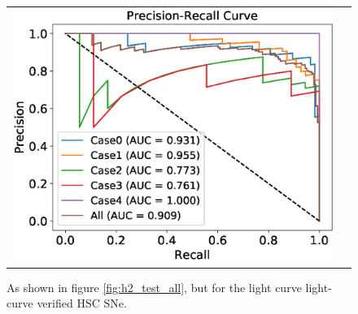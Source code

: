 \documentclass[proof]{pasj01}
\providecommand{\DIFadd}[1]{{\protect\color{blue} \sf #1}} %
\providecommand{\DIFdel}[1]{{\protect\color{red} \scriptsize #1}} %
\providecommand{\DIFaddFL}[1]{\DIFadd{#1}} %
\providecommand{\DIFdelFL}[1]{\DIFdel{#1}} %
\providecommand{\DIFaddbeginFL}{} %
\providecommand{\DIFaddendFL}{} %
\providecommand{\DIFdelbeginFL}{} %
\providecommand{\DIFdelendFL}{} %
\newcommand{\DIFscaledelfig}{0.5}
\newlength{\DIFdelgraphicswidth} %
\newlength{\DIFdelgraphicsheight} %
\newcommand{\DIFaddincludegraphics}[2][]{{\color{blue}\fbox{\DIFOincludegraphics[#1]{#2}}}} %
\newcommand{\DIFdelincludegraphics}[2][]{%
\sbox{\DIFdelgraphicsbox}{\DIFOincludegraphics[#1]{#2}}%
\settoboxwidth{\DIFdelgraphicswidth}{\DIFdelgraphicsbox} %
\settoboxtotalheight{\DIFdelgraphicsheight}{\DIFdelgraphicsbox} %
\scalebox{\DIFscaledelfig}{%
\parbox[b]{\DIFdelgraphicswidth}{\usebox{\DIFdelgraphicsbox}\\[-\baselineskip] \rule{\DIFdelgraphicswidth}{0em}}\llap{\resizebox{\DIFdelgraphicswidth}{\DIFdelgraphicsheight}{%
\setlength{\unitlength}{\DIFdelgraphicswidth}%
\begin{picture}(1,1)%
\thicklines\linethickness{2pt} %
{\color[rgb]{1,0,0}\put(0,0){\framebox(1,1){}}}%
{\color[rgb]{1,0,0}\put(0,0){\line( 1,1){1}}}%
{\color[rgb]{1,0,0}\put(0,1){\line(1,-1){1}}}%
\end{picture}%
}\hspace*{3pt}}} %
} %
\DeclareRobustCommand{\DIFaddbeginFL}{\DIFOaddbeginFL \let\includegraphics\DIFaddincludegraphics} %
\DeclareRobustCommand{\DIFaddendFL}{\DIFOaddendFL \let\includegraphics\DIFOincludegraphics} %
\DeclareRobustCommand{\DIFdelbeginFL}{\DIFOdelbeginFL \let\includegraphics\DIFdelincludegraphics} %
\DeclareRobustCommand{\DIFdelendFL}{\DIFOaddendFL \let\includegraphics\DIFOincludegraphics} %
\begin{document}
\begin{figure}[htbp]
\begin{tabular}{cc}
\begin{minipage}{0.5\hsize}
\begin{center}
                \includegraphics[width=\columnwidth]{figures/10_absolute-magnitude-scaled-flux-remove-y_SNdata_test_190522_PreRec_noedge_spec.eps}
            \end{center}
        \end{minipage}
    \end{tabular}
    \vspace{2mm}
    \caption{%
  As shown in figure \ref{fig:h2_test_all}, but for the \DIFdelbeginFL \DIFdelFL{light curve }\DIFdelendFL \DIFaddbeginFL \DIFaddFL{light-curve }\DIFaddendFL verified HSC SNe. 
}%
    \label{fig:h2_test_gold}
\end{figure}
%
%
%
%
%
%
\end{document}
